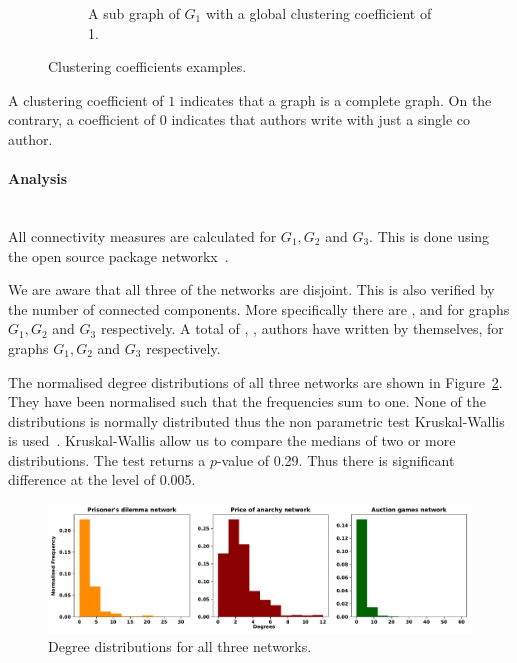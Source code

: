\documentclass{article}
\theoremstyle{definition}
\newcommand{\prisonerscon}{}
\newcommand{\pricecon}{}
\newcommand{\auctioncon}{}
\newcommand{\prisonerisolated}{}
\newcommand{\auctionisolated}{}
\newcommand{\priceisolated}{}
\begin{document}
\begin{center}
\begin{figure}[!hbtp]
\begin{subfigure}{0.33\textwidth}
            \caption{A sub graph of \(G_1\) with a global clustering coefficient of 1.}
        \end{subfigure}
    \caption{Clustering coefficients examples.}
    \label{fig:clustering_coefficients}
    \end{figure}
    \end{center}

A clustering coefficient of \(1\) indicates that a graph is a
complete graph. On the contrary, a coefficient of \(0\) indicates that authors write
with just a single co author.

\paragraph{Analysis}
\mbox{ }\\

All connectivity measures are calculated for \(G_1, G_2\) and \(G_3\). This is
done using the open source package networkx~\cite{networkx}.

We are aware that all three of the networks are disjoint. This is also verified
by the number of connected components. More specifically there are \prisonerscon,
\auctioncon and \pricecon for graphs \(G_1, G_2\) and \(G_3\) respectively.
A total of \prisonerisolated, \auctionisolated, \priceisolated authors have
written by themselves, for graphs \(G_1, G_2\) and \(G_3\) respectively.

The normalised degree distributions of all three networks are shown in Figure~\ref{fig:degrees_dist}.
They have been normalised such that the frequencies sum to one. 
None of the distributions is normally distributed thus the non parametric test
Kruskal-Wallis is used~\cite{mckight2010}. Kruskal-Wallis allow us to compare the
medians of two or more distributions. The test returns a \(p\)-value of 0.29.
Thus there is significant difference at the level of 0.005.

\begin{figure}[!hbtp]
    \centering
    \includegraphics[width=\textwidth]{./assets/images/degrees_histrograms.pdf}
    \caption{Degree distributions for all three networks.}\label{fig:degrees_dist}
\end{figure}
\end{document}
